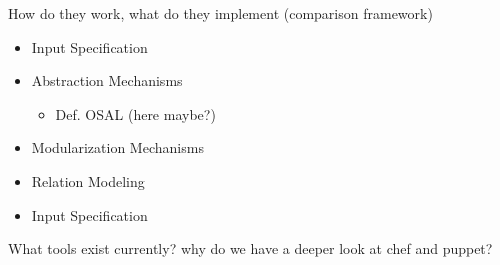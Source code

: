 How do they work, what do they implement (comparison framework)

	\begin{itemize}
	\item Input Specification
	\item Abstraction Mechanisms
	\begin{itemize}
		\item Def. OSAL (here maybe?)
	\end{itemize}
	\item Modularization Mechanisms
	\item Relation Modeling
	\item Input Specification
	\end{itemize}


What tools exist currently? why do we have a deeper look at chef and puppet?
